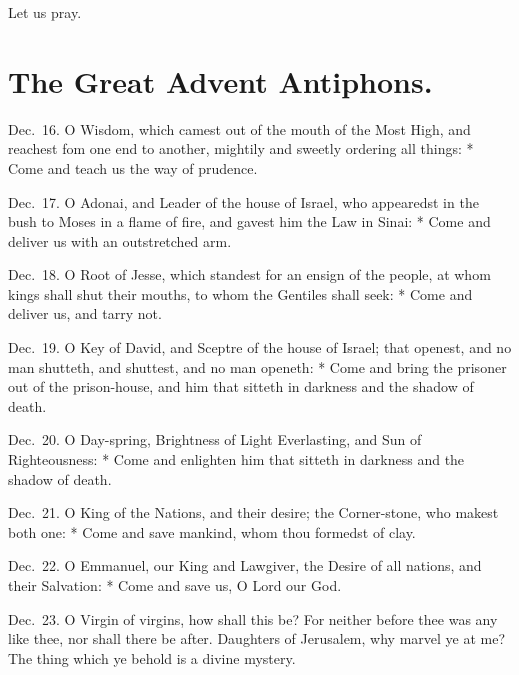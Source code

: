 \centerline{Let us pray.}


\fleuron


\section{The Great Advent Antiphons.}

Dec.~16.  O Wisdom, which camest out of the mouth of the Most High, and reachest fom one end to another, mightily and sweetly ordering all things: * Come and teach us the way of prudence.

Dec.~17.   O Adonai, and Leader of the house of Israel, who appearedst in the bush to Moses in a flame of fire, and gavest him the Law in Sinai: * Come and deliver us with an outstretched arm.

Dec.~18.  O Root of Jesse, which standest for an ensign of the people, at whom kings shall shut their mouths, to whom the Gentiles shall seek: * Come and deliver us, and tarry not.

Dec.~19.   O Key of David, and Sceptre of the house of Israel; that openest, and no man shutteth, and shuttest, and no man openeth: * Come and bring the prisoner out of the prison-house, and him that sitteth in darkness and the shadow of death.

Dec.~20.    O Day-spring, Brightness of Light Everlasting, and Sun of Righteousness: * Come and enlighten him that sitteth in darkness and the shadow of death.

Dec.~21.    O King of the Nations, and their desire; the Corner-stone, who makest both one: * Come and save mankind, whom thou formedst of clay.

Dec.~22.    O Emmanuel, our King and Lawgiver, the Desire of all nations, and their Salvation: * Come and save us, O Lord our God.

Dec.~23.    O Virgin of virgins, how shall this be?  For neither before thee was any like thee, nor shall there be after.  Daughters of Jerusalem, why marvel ye at me? The thing which ye behold is a divine mystery.

